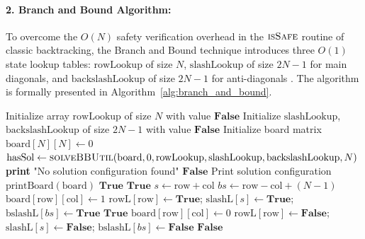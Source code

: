\documentclass[a4paper,fleqn]{cas-sc}
\begin{document}
\paragraph{2. Branch and Bound Algorithm:}
To overcome the $O(N)$ safety verification overhead in the $\Call{isSafe}{}$ routine of classic backtracking, the Branch and Bound technique introduces three $O(1)$ state lookup tables: $\text{rowLookup}$ of size $N$, $\text{slashLookup}$ of size $2N-1$ for main diagonals, and $\text{backslashLookup}$ of size $2N-1$ for anti-diagonals \cite{bitner1975backtrack}. The algorithm is formally presented in Algorithm~\ref{alg:branch_and_bound}.

\begin{algorithm}[htbp]
\caption{Solving the $N$-Queens Problem using Branch and Bound}
\label{alg:branch_and_bound}
\begin{algorithmic}[1]
    \State Initialize array $\text{rowLookup}$ of size $N$ with value $\mathbf{False}$
    \State Initialize $\text{slashLookup}$, $\text{backslashLookup}$ of size $2N-1$ with value $\mathbf{False}$
    \State Initialize board matrix $\text{board}[N][N] \gets 0$
    \State $\text{hasSol} \gets \Call{solveBBUtil}{\text{board}, 0, \text{rowLookup}, \text{slashLookup}, \text{backslashLookup}, N}$
        \State \textbf{print} "No solution configuration found"
        \State \Return $\mathbf{False}$
    \EndIf
    \State Print solution configuration $\text{printBoard}(\text{board})$
    \State \Return $\mathbf{True}$
\EndFunction
\Statex
{}
        \State \Return $\mathbf{True}$
    \EndIf
        \State $s \gets \text{row} + \text{col}$
        \State $bs \gets \text{row} - \text{col} + (N-1)$
            \State $\text{board}[\text{row}][\text{col}] \gets 1$
            \State $\text{rowL}[\text{row}] \gets \mathbf{True}$; $\text{slashL}[s] \gets \mathbf{True}$; $\text{bslashL}[bs] \gets \mathbf{True}$
                \State \Return $\mathbf{True}$
            \EndIf
            \State $\text{board}[\text{row}][\text{col}] \gets 0$ 
            \State $\text{rowL}[\text{row}] \gets \mathbf{False}$; $\text{slashL}[s] \gets \mathbf{False}$; $\text{bslashL}[bs] \gets \mathbf{False}$
        \EndIf
    \EndFor
    \State \Return $\mathbf{False}$
\EndFunction
\end{algorithmic}
\end{algorithm}
\end{document}
